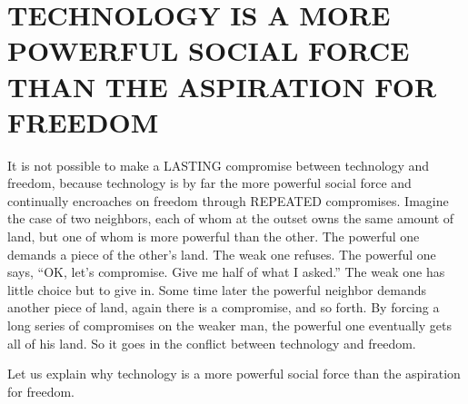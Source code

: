 \chapter{TECHNOLOGY IS A MORE POWERFUL SOCIAL FORCE THAN THE ASPIRATION FOR FREEDOM}

 It is not possible to make a LASTING compromise between technology and freedom, because technology is by far the more powerful social force and continually encroaches on freedom through REPEATED compromises. Imagine the case of two neighbors, each of whom at the outset owns the same amount of land, but one of whom is more powerful than the other. The powerful one demands a piece of the other’s land. The weak one refuses. The powerful one says, “OK, let’s compromise. Give me half of what I asked.” The weak one has little choice but to give in. Some time later the powerful neighbor demands another piece of land, again there is a compromise, and so forth. By forcing a long series of compromises on the weaker man, the powerful one eventually gets all of his land. So it goes in the conflict between technology and freedom.

 Let us explain why technology is a more powerful social force than the aspiration for freedom.

